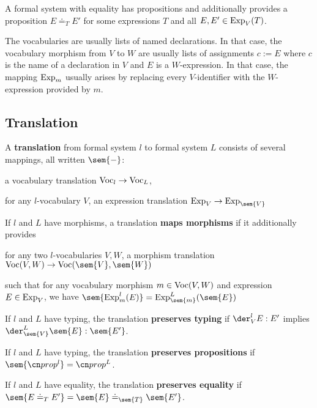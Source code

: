 \begin{definition}
A formal system with equality has propositions and additionally provides a proposition $E\doteq_T E'$ for some expressions $T$ and all $E,E'\in\mathrm{Exp}_V(T)$.
\end{definition}

The vocabularies are usually lists of named declarations.
In that case, the vocabulary morphism from $V$ to $W$ are usually lists of assignments $c:=E$ where $c$ is the name of a declaration in $V$ and $E$ is a $W$-expression.
In that case, the mapping $\mathrm{Exp}_m$ usually arises by replacing every $V$-identifier with the $W$-expression provided by $m$.

\subsection{Translation}

\begin{definition}\label{def:css}
A \textbf{translation} from formal system $l$ to formal system $L$ consists of several mappings, all written $\sem{-}$:
\begin{compactitem}
 \item a vocabulary translation $\mathrm{Voc}_l\to \mathrm{Voc}_L$,
 \item for any $l$-vocabulary $V$, an expression translation $\Exp_V\to \Exp_{\sem{V}}$
\end{compactitem}

If $l$ and $L$ have morphisms, a translation \textbf{maps morphisms} if it additionally provides
\begin{compactitem}
 \item for any two $l$-vocabularies $V,W$, a morphism translation $\VocM(V,W)\to \VocM(\sem{V},\sem{W})$
 \item such that for any vocabulary morphism $m\in\mathrm{Voc}(V,W)$ and expression $E\in\mathrm{Exp}_V$, we have $\sem{\Exp^l_m(E)}=\Exp^L_{\sem{m}}(\sem{E})$
\end{compactitem}

If $l$ and $L$ have typing, the translation \textbf{preserves typing} if $\der^l_V E:E'$ implies $\der^L_{\sem{V}}\sem{E}:\sem{E'}$.

If $l$ and $L$ have typing, the translation \textbf{preserves propositions} if $\sem{\prop^l}=\prop^L$.

If $l$ and $L$ have equality, the translation \textbf{preserves equality} if $\sem{E\doteq_T E'}=\sem{E}\doteq_{\sem{T}}\sem{E'}$.
\end{definition}

